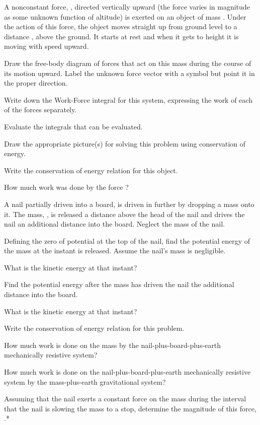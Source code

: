 {\begin{two-digit-list}
\item [20.] A nonconstant force, , directed vertically upward (the force
varies in magnitude as some unknown function of altitude) is exerted on an
object of mass .
Under the action of this force, the object moves straight up from ground
level to a distance , above the ground.
It starts at rest and when it gets to height  it is moving with speed 
upward.
\begin{one-digit-list}
\item [a.] Draw the free-body diagram of forces that act on this mass during
the course of its motion upward.
Label the unknown force vector with a symbol but point it in the proper
direction. 
\item [b.] Write down the Work-Force integral for this system, expressing
the work of each of the forces separately. 
\item [c.] Evaluate the integrals that can be evaluated. 
\item [d.] Draw the appropriate picture(s) for solving this problem using
conservation of energy. 
\item [e.] Write the conservation of energy relation for this object. 
\item [f.] How much work was done by the force ? 
\end{one-digit-list}

\item [21.] A nail partially driven into a board, is driven in further by
dropping a mass onto it.
The mass, , is released a distance  above the head of the nail and
drives the nail an additional distance  into the board.
Neglect the mass of the nail.
\begin{one-digit-list}
\item [a.] Defining the zero of potential at the top of the nail, find
the potential energy of the mass  at the instant  is released.
Assume the nail's mass is negligible. 
\item [b.] What is the kinetic energy at that instant? 
\item [c.] Find the potential energy after the mass has driven the nail the
additional distance  into the board. 
\item [d.] What is the kinetic energy at that instant? 
\item [e.] Write the conservation of energy relation for this problem. 
\item [f.] How much work is done on the mass  by the
nail-plus-board-plus-earth mechanically resistive system? 
\item [g.] How much work is done on the nail-plus-board-plus-earth
mechanically resistive system by the mass-plus-earth gravitational system? 
\item [h.] Assuming that the nail exerts a constant force on the mass during
the interval that the nail is slowing the mass to a stop, determine the
magnitude of this force, .* 
\end{one-digit-list}


\end{two-digit-list}}
